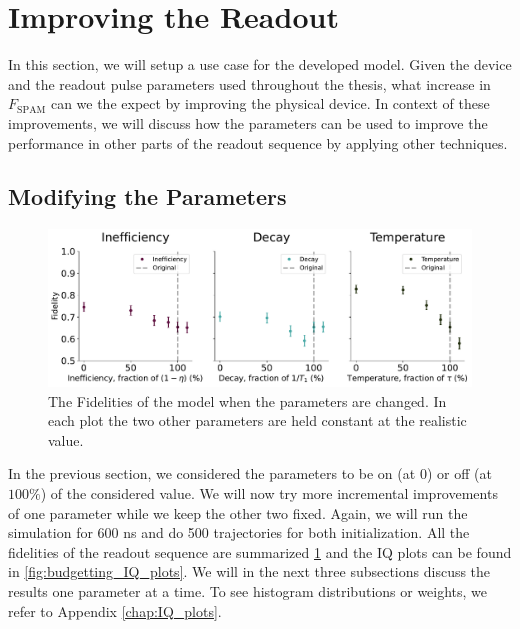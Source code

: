 \section{Improving the Readout}
In this section, we will setup a use case for the developed model. Given the device and the readout pulse parameters used throughout the thesis, what increase in $F_{\text{SPAM}}$ can we the expect by improving the physical device. In context of these improvements, we will discuss how the parameters can be used to improve the performance in other parts of the readout sequence by applying other techniques. 




\subsection{Modifying the Parameters}
\begin{figure}[t]
    \centering
    \includegraphics[width = \linewidth]{Simulations/budgets/figures/fidelities_at_different_parameters.pdf}
    \caption{The Fidelities of the model when the parameters are changed. In each plot the two other parameters are held constant at the realistic value.}
    \label{fig:scan_of_fidelities_at_different_parameters}
\end{figure}
In the previous section, we considered the parameters to be on (at $0$) or off (at $100 \%$) of the considered value. We will now try more incremental improvements of one parameter while we keep the other two fixed. Again, we will run the simulation for 600 ns and do 500 trajectories for both initialization. All the fidelities of the readout sequence are summarized \ref{fig:scan_of_fidelities_at_different_parameters} and the IQ plots can be found in \ref{fig:budgetting_IQ_plots}. We will in the next three subsections discuss the results one parameter at a time. To see histogram distributions or weights, we refer to Appendix \ref{chap:IQ_plots}.

